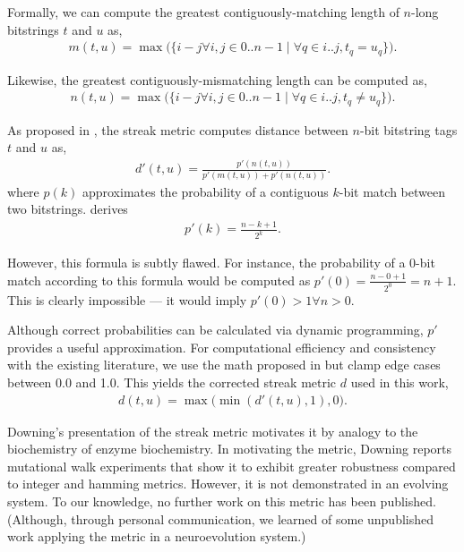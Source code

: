 Formally, we can compute the greatest contiguously-matching length of $n$-long bitstrings $t$ and $u$ as,
\begin{align*}
m(t, u) = \max\Big(\{i - j \forall i, j \in 0..n-1 \mid \forall q \in i..j, t_q = u_q \}\Big).
\end{align*}

Likewise, the greatest contiguously-mismatching length can be computed as,
\begin{align*}
n(t, u) = \max\Big(\{i - j \forall i, j \in 0..n-1 \mid \forall q \in i..j, t_q \neq u_q \}\Big).
\end{align*}

As proposed in \cite{downing2015intelligence}, the streak metric computes distance between $n$-bit bitstring tags $t$ and $u$ as,
\begin{align*}
d'(t, u)
= \frac{p'(n(t,u))}{p'(m(t,u)) + p'(n(t,u))}.
\end{align*}
where $p(k)$ approximates the probability of a contiguous $k$-bit match between two bitstrings.
\cite{downing2015intelligence} derives
\begin{align*}
p'(k)
= \frac{n - k + 1}{2^k}.
\end{align*}

However, this formula is subtly flawed.
For instance, the probability of a $0$-bit match according to this formula would be computed as $p'(0) = \frac{n - 0 + 1}{2^0} = n + 1$.
This is clearly impossible --- it would imply $p'(0) > 1 \forall n > 0$.

Although correct probabilities can be calculated via dynamic programming, $p'$ provides a useful approximation.
For computational efficiency and consistency with the existing literature, we use the math proposed in \citep{downing2015intelligence} but clamp edge cases between 0.0 and 1.0.
This yields the corrected streak metric $d$ used in this work,
\begin{align*}
d(t, u) = \max\Big( \min( d'(t, u), 1), 0 \Big).
\end{align*}

Downing's presentation of the streak metric motivates it by analogy to the biochemistry of enzyme biochemistry. 
In motivating the metric, Downing reports mutational walk experiments that show it to exhibit greater robustness compared to integer and hamming metrics.
However, it is not demonstrated in an evolving system.
To our knowledge, no further work on this metric has been published.
(Although, through personal communication, we learned of some unpublished work applying the metric in a neuroevolution system.)

